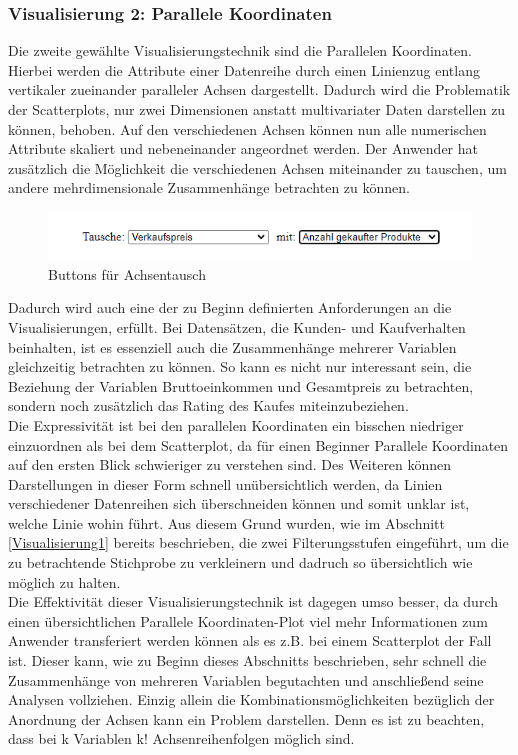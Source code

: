 \documentclass[usegeometry=true]{scrartcl}
\begin{document}
\subsubsection{Visualisierung 2: Parallele Koordinaten}\label{Visualisierung2}
Die zweite gewählte Visualisierungstechnik sind die Parallelen Koordinaten. Hierbei werden die Attribute einer Datenreihe durch einen Linienzug entlang vertikaler zueinander
paralleler Achsen dargestellt. \cite[594]{Lehmann2010} Dadurch wird die Problematik der Scatterplots, nur zwei Dimensionen anstatt multivariater Daten darstellen zu können,
behoben.\cite[1]{Wegman1990} Auf den verschiedenen Achsen können nun alle numerischen Attribute skaliert und nebeneinander angeordnet werden. Der Anwender hat zusätzlich die
Möglichkeit die verschiedenen Achsen miteinander zu tauschen, um andere mehrdimensionale Zusammenhänge betrachten zu können.
\begin{figure} [H]
	\begin{center}
		\includegraphics[width=15cm]{IMG/Achsentausch.png}
		\caption{Buttons für Achsentausch}
		\label{fig:Achsentausch}
	\end{center}
\end{figure}
\noindent Dadurch wird auch eine der zu Beginn definierten Anforderungen an die Visualisierungen, erfüllt. Bei Datensätzen, die Kunden- und Kaufverhalten beinhalten, ist es essenziell
auch die Zusammenhänge mehrerer Variablen gleichzeitig betrachten zu können. So kann es nicht nur interessant sein, die Beziehung der Variablen Bruttoeinkommen und Gesamtpreis
zu betrachten, sondern noch zusätzlich das Rating des Kaufes miteinzubeziehen.\\
Die Expressivität ist bei den parallelen Koordinaten ein bisschen niedriger einzuordnen als bei
dem Scatterplot, da für einen Beginner Parallele Koordinaten auf den ersten Blick schwieriger zu verstehen sind. Des Weiteren können Darstellungen in dieser Form schnell unübersichtlich
werden, da Linien verschiedener Datenreihen sich überschneiden können und somit unklar ist, welche Linie wohin führt. Aus diesem Grund wurden, wie im Abschnitt
\ref{Visualisierung1} bereits beschrieben, die zwei Filterungsstufen eingeführt, um die zu betrachtende Stichprobe zu verkleinern und dadruch so übersichtlich wie
möglich zu halten. \\
Die Effektivität dieser Visualisierungstechnik ist dagegen umso besser, da durch einen übersichtlichen Parallele Koordinaten-Plot viel mehr Informationen zum
Anwender transferiert werden können als es z.B. bei einem Scatterplot der Fall ist. Dieser kann, wie zu Beginn dieses Abschnitts beschrieben, sehr schnell die Zusammenhänge von
mehreren Variablen begutachten und anschließend seine Analysen vollziehen. Einzig allein die Kombinationsmöglichkeiten bezüglich der Anordnung der Achsen kann ein Problem
darstellen. Denn es ist zu beachten, dass bei k Variablen k! Achsenreihenfolgen möglich sind.\cite[594]{Lehmann2010}
\end{document}
